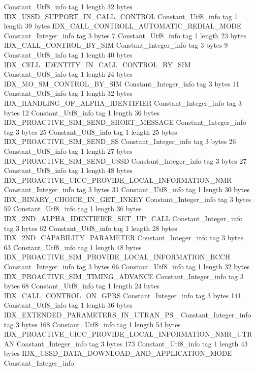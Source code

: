 {{		Constant_Utf8_info {
			tag	1
			length	32
			bytes	IDX_USSD_SUPPORT_IN_CALL_CONTROL
		}
		Constant_Utf8_info {
			tag	1
			length	39
			bytes	IDX_CALL_CONTROLL_AUTOMATIC_REDIAL_MODE
		}
		Constant_Integer_info {
			tag	3
			bytes	7
		}
		Constant_Utf8_info {
			tag	1
			length	23
			bytes	IDX_CALL_CONTROL_BY_SIM
		}
		Constant_Integer_info {
			tag	3
			bytes	9
		}
		Constant_Utf8_info {
			tag	1
			length	40
			bytes	IDX_CELL_IDENTITY_IN_CALL_CONTROL_BY_SIM
		}
		Constant_Utf8_info {
			tag	1
			length	24
			bytes	IDX_MO_SM_CONTROL_BY_SIM
		}
		Constant_Integer_info {
			tag	3
			bytes	11
		}
		Constant_Utf8_info {
			tag	1
			length	32
			bytes	IDX_HANDLING_OF_ALPHA_IDENTIFIER
		}
		Constant_Integer_info {
			tag	3
			bytes	12
		}
		Constant_Utf8_info {
			tag	1
			length	36
			bytes	IDX_PROACTIVE_SIM_SEND_SHORT_MESSAGE
		}
		Constant_Integer_info {
			tag	3
			bytes	25
		}
		Constant_Utf8_info {
			tag	1
			length	25
			bytes	IDX_PROACTIVE_SIM_SEND_SS
		}
		Constant_Integer_info {
			tag	3
			bytes	26
		}
		Constant_Utf8_info {
			tag	1
			length	27
			bytes	IDX_PROACTIVE_SIM_SEND_USSD
		}
		Constant_Integer_info {
			tag	3
			bytes	27
		}
		Constant_Utf8_info {
			tag	1
			length	48
			bytes	IDX_PROACTIVE_UICC_PROVIDE_LOCAL_INFORMATION_NMR
		}
		Constant_Integer_info {
			tag	3
			bytes	31
		}
		Constant_Utf8_info {
			tag	1
			length	30
			bytes	IDX_BINARY_CHOICE_IN_GET_INKEY
		}
		Constant_Integer_info {
			tag	3
			bytes	59
		}
		Constant_Utf8_info {
			tag	1
			length	36
			bytes	IDX_2ND_ALPHA_IDENTIFIER_SET_UP_CALL
		}
		Constant_Integer_info {
			tag	3
			bytes	62
		}
		Constant_Utf8_info {
			tag	1
			length	28
			bytes	IDX_2ND_CAPABILITY_PARAMETER
		}
		Constant_Integer_info {
			tag	3
			bytes	63
		}
		Constant_Utf8_info {
			tag	1
			length	48
			bytes	IDX_PROACTIVE_SIM_PROVIDE_LOCAL_INFORMATION_BCCH
		}
		Constant_Integer_info {
			tag	3
			bytes	66
		}
		Constant_Utf8_info {
			tag	1
			length	32
			bytes	IDX_PROACTIVE_SIM_TIMING_ADVANCE
		}
		Constant_Integer_info {
			tag	3
			bytes	68
		}
		Constant_Utf8_info {
			tag	1
			length	24
			bytes	IDX_CALL_CONTROL_ON_GPRS
		}
		Constant_Integer_info {
			tag	3
			bytes	141
		}
		Constant_Utf8_info {
			tag	1
			length	36
			bytes	IDX_EXTENDED_PARAMETERS_IN_UTRAN_PS_
		}
		Constant_Integer_info {
			tag	3
			bytes	168
		}
		Constant_Utf8_info {
			tag	1
			length	54
			bytes	IDX_PROACTIVE_UICC_PROVIDE_LOCAL_INFORMATION_NMR_UTRAN
		}
		Constant_Integer_info {
			tag	3
			bytes	173
		}
		Constant_Utf8_info {
			tag	1
			length	43
			bytes	IDX_USSD_DATA_DOWNLOAD_AND_APPLICATION_MODE
		}
		Constant_Integer_info {
}}}
